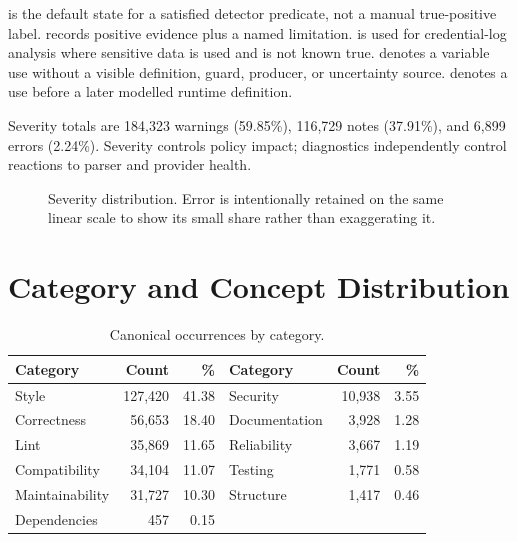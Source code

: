  is the default state for a satisfied detector predicate, not
a manual true-positive label.  records positive evidence plus
a named limitation.  is used for credential-log analysis where
sensitive data is used and  is not known true.
 denotes a variable use without a visible definition, guard,
producer, or uncertainty source.  denotes a use before a
later modelled runtime definition.

Severity totals are 184,323 warnings (59.85\%), 116,729 notes (37.91\%), and
6,899 errors (2.24\%). Severity controls policy impact; diagnostics independently
control reactions to parser and provider health.

\begin{figure}[H]
\centering
{}
\caption{Severity distribution. Error is intentionally retained on the same
linear scale to show its small share rather than exaggerating it.}
\label{fig:severity_results}
\end{figure}

\section{Category and Concept Distribution}
\begin{table}[H]
\centering
\caption{Canonical occurrences by category.}
\small
\begin{tabular}{lrr@{\hspace{8mm}}lrr}
\toprule
Category & Count & \% & Category & Count & \% \\
\midrule
Style & 127,420 & 41.38 & Security & 10,938 & 3.55 \\
Correctness & 56,653 & 18.40 & Documentation & 3,928 & 1.28 \\
Lint & 35,869 & 11.65 & Reliability & 3,667 & 1.19 \\
Compatibility & 34,104 & 11.07 & Testing & 1,771 & 0.58 \\
Maintainability & 31,727 & 10.30 & Structure & 1,417 & 0.46 \\
Dependencies & 457 & 0.15 & & & \\
\bottomrule
\end{tabular}
\end{table}

